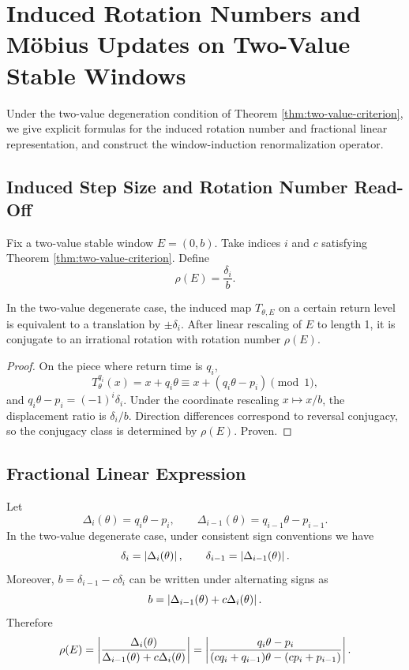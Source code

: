 \section{Induced Rotation Numbers and Möbius Updates on Two-Value Stable Windows}

Under the two-value degeneration condition of Theorem \ref{thm:two-value-criterion}, we give explicit formulas for the induced rotation number and fractional linear representation, and construct the window-induction renormalization operator.

\subsection{Induced Step Size and Rotation Number Read-Off}

Fix a two-value stable window $E=(0,b)$. Take indices $i$ and $c$ satisfying Theorem \ref{thm:two-value-criterion}. Define
\[
\rho(E)=\frac{\delta_i}{b}.
\]

\begin{proposition}\label{prop:induced-step}
In the two-value degenerate case, the induced map $T_{\theta,E}$ on a certain return level is equivalent to a translation by $\pm\delta_i$. After linear rescaling of $E$ to length 1, it is conjugate to an irrational rotation with rotation number $\rho(E)$.
\end{proposition}

\begin{proof}
On the piece where return time is $q_i$,
\[
T_\theta^{q_i}(x)=x+q_i\theta \equiv x+(q_i\theta-p_i)\pmod 1,
\]
and $q_i\theta-p_i=(-1)^i\delta_i$. Under the coordinate rescaling $x\mapsto x/b$, the displacement ratio is $\delta_i/b$. Direction differences correspond to reversal conjugacy, so the conjugacy class is determined by $\rho(E)$. Proven.
\end{proof}

\subsection{Fractional Linear Expression}

Let
\[
\Delta_i(\theta)=q_i\theta-p_i,\qquad \Delta_{i-1}(\theta)=q_{i-1}\theta-p_{i-1}.
\]
In the two-value degenerate case, under consistent sign conventions we have
\[
\delta_i=\left\lvert \Delta_i(\theta)\right\rvert,\qquad \delta_{i-1}=\left\lvert \Delta_{i-1}(\theta)\right\rvert.
\]
Moreover, $b=\delta_{i-1}-c\delta_i$ can be written under alternating signs as
\[
b=\left\lvert \Delta_{i-1}(\theta)+c\Delta_i(\theta)\right\rvert.
\]
Therefore
\[
\rho(E)=\left\lvert \frac{\Delta_i(\theta)}{\Delta_{i-1}(\theta)+c\Delta_i(\theta)}\right\rvert
=\left\lvert \frac{q_i\theta-p_i}{(c q_i+q_{i-1})\theta-(c p_i+p_{i-1})}\right\rvert.
\]

